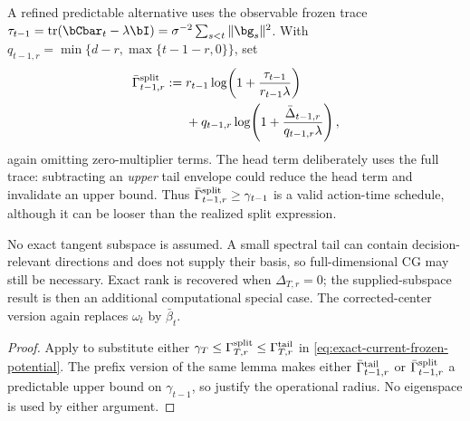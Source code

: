 \begin{corollary}
A refined predictable alternative uses the observable frozen trace
$\tau_{t-1}=\operatorname{tr}(\bCbar_t-\lambda\bI)
=\sigma^{-2}\sum_{s<t}\|\bg_s\|^2$.  With
$q_{t-1,r}=\min\{d-r,\max\{t-1-r,0\}\}$, set
\begin{equation}\label{eq:predictable-split-envelope}
\begin{aligned}
 \bar\Gamma^{\rm split}_{t-1,r}:={}&
 r_{t-1}\log\!\left(1+\frac{\tau_{t-1}}{r_{t-1}\lambda}\right)\\
 &+q_{t-1,r}\log\!\left(1+
 \frac{\bar\Delta_{t-1,r}}{q_{t-1,r}\lambda}\right),
\end{aligned}
\end{equation}
again omitting zero-multiplier terms.  The head term deliberately uses the
full trace: subtracting an \emph{upper} tail envelope could reduce the head
term and invalidate an upper bound.  Thus
$\bar\Gamma^{\rm split}_{t-1,r}\ge\gamma_{t-1}$ is a valid action-time
schedule, although it can be looser than the realized split expression.

No exact tangent subspace is assumed.  A small spectral tail can contain
decision-relevant directions and does not supply their basis, so
full-dimensional CG may still be necessary.  Exact rank is recovered when
$\Delta_{T,r}=0$; the supplied-subspace result
 is then an additional computational special case.
The corrected-center version again replaces $\omega_t$ by $\bar\beta_t$.
\end{corollary}
\begin{proof}
Apply  to substitute either
$\gamma_T\le\Gamma^{\rm split}_{T,r}\le\Gamma^{\rm tail}_{T,r}$ in
\eqref{eq:exact-current-frozen-potential}.  The prefix version of the same
lemma makes either $\bar\Gamma^{\rm tail}_{t-1,r}$ or
$\bar\Gamma^{\rm split}_{t-1,r}$ a predictable upper bound on
$\gamma_{t-1}$, so  justify the
operational radius.  No eigenspace is used by either argument.
\end{proof}

